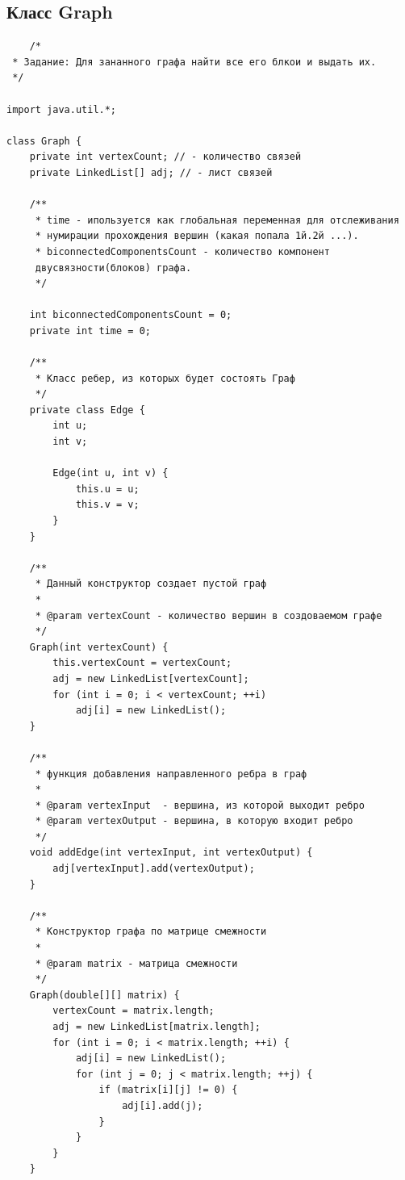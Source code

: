 \documentclass[12pt,a4paper]{scrartcl}
\begin{document}
\subsection{Класс Graph}
	\begin{verbatim}
	/*
 * Задание: Для зананного графа найти все его блкои и выдать их.
 */

import java.util.*;

class Graph {
    private int vertexCount; // - количество связей
    private LinkedList[] adj; // - лист связей

    /**
     * time - ипользуется как глобальная переменная для отслеживания
     * нумирации прохождения вершин (какая попала 1й.2й ...).
     * biconnectedComponentsCount - количество компонент
     двусвязности(блоков) графа.
     */

    int biconnectedComponentsCount = 0;
    private int time = 0;

    /**
     * Класс ребер, из которых будет состоять Граф
     */
    private class Edge {
        int u;
        int v;

        Edge(int u, int v) {
            this.u = u;
            this.v = v;
        }
    }

    /**
     * Данный конструктор создает пустой граф
     *
     * @param vertexCount - количество вершин в создоваемом графе
     */
    Graph(int vertexCount) {
        this.vertexCount = vertexCount;
        adj = new LinkedList[vertexCount];
        for (int i = 0; i < vertexCount; ++i)
            adj[i] = new LinkedList();
    }

    /**
     * функция добавления направленного ребра в граф
     *
     * @param vertexInput  - вершина, из которой выходит ребро
     * @param vertexOutput - вершина, в которую входит ребро
     */
    void addEdge(int vertexInput, int vertexOutput) {
        adj[vertexInput].add(vertexOutput);
    }

    /**
     * Конструктор графа по матрице смежности
     *
     * @param matrix - матрица смежности
     */
    Graph(double[][] matrix) {
        vertexCount = matrix.length;
        adj = new LinkedList[matrix.length];
        for (int i = 0; i < matrix.length; ++i) {
            adj[i] = new LinkedList();
            for (int j = 0; j < matrix.length; ++j) {
                if (matrix[i][j] != 0) {
                    adj[i].add(j);
                }
            }
        }
    }


\end{verbatim}
\end{document}
